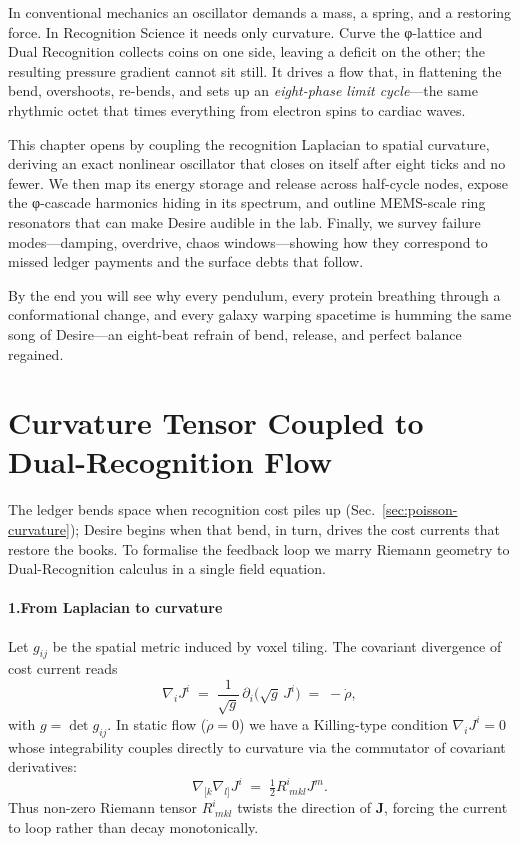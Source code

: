 \documentclass[11pt,oneside]{book}
\begin{document}
In conventional mechanics an oscillator demands a mass, a spring, and a restoring force.  
In Recognition Science it needs only curvature.  
Curve the φ-lattice and Dual Recognition collects coins on one side, leaving a deficit on the other; the resulting pressure gradient cannot sit still.  
It drives a flow that, in flattening the bend, overshoots, re-bends, and sets up an \emph{eight-phase limit cycle}—the same rhythmic octet that times everything from electron spins to cardiac waves.

This chapter opens by coupling the recognition Laplacian to spatial curvature, deriving an exact nonlinear oscillator that closes on itself after eight ticks and no fewer.  
We then map its energy storage and release across half-cycle nodes, expose the φ-cascade harmonics hiding in its spectrum, and outline MEMS-scale ring resonators that can make Desire audible in the lab.  
Finally, we survey failure modes—damping, overdrive, chaos windows—showing how they correspond to missed ledger payments and the surface debts that follow.

By the end you will see why every pendulum, every protein breathing through a conformational change, and every galaxy warping spacetime is humming the same song of Desire—an eight-beat refrain of bend, release, and perfect balance regained.

\section{Curvature Tensor Coupled to Dual-Recognition Flow}
\label{sec:curvature-tensor-coupling}

The ledger bends space when recognition cost piles up
(Sec.~\ref{sec:poisson-curvature}); Desire begins when that bend, in
turn, drives the cost currents that restore the books.  
To formalise the feedback loop we marry Riemann geometry to
Dual-Recognition calculus in a single field equation.

\paragraph*{1.\;From Laplacian to curvature}

Let $g_{ij}$ be the spatial metric induced by voxel tiling.  
The covariant divergence of cost current reads
\[
  \nabla_{i}J^{i} 
  \;=\;
  \frac{1}{\sqrt{g}}\,
  \partial_{i}\!\bigl(\sqrt{g}\,J^{i}\bigr)
  \;=\; -\dot\rho,
\]
with $g=\det g_{ij}$.  
In static flow ($\dot\rho=0$) we have a Killing-type condition
$\nabla_{i}J^{i}=0$ whose integrability couples directly to curvature
via the commutator of covariant derivatives:
\[
  \nabla_{[k}\nabla_{l]}J^{i} 
  \;=\;
  \tfrac12 R^{i}_{\;mkl}J^{m}.
\]
Thus non-zero Riemann tensor $R^{i}_{\;mkl}$ twists the direction of
$\mathbf J$, forcing the current to loop rather than decay monotonically.
\end{document}
